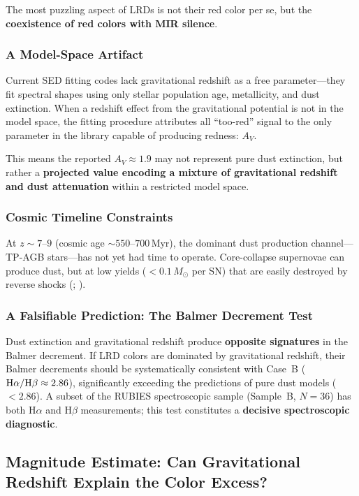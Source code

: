 \documentclass[apj,twocolumn,longbibliography,linenumbers]{aastex701}
\begin{document}
The most puzzling aspect of LRDs is not their red color per se, but the \textbf{coexistence of red colors with MIR silence}.

\subsubsection{A Model-Space Artifact}

Current SED fitting codes lack gravitational redshift as a free parameter---they fit spectral shapes using only stellar population age, metallicity, and dust extinction. When a redshift effect from the gravitational potential is not in the model space, the fitting procedure attributes all ``too-red'' signal to the only parameter in the library capable of producing redness: $A_V$.

This means the reported $A_V \approx 1.9$ may not represent pure dust extinction, but rather a \textbf{projected value encoding a mixture of gravitational redshift and dust attenuation} within a restricted model space.

\subsubsection{Cosmic Timeline Constraints}

At $z \sim 7$--$9$ (cosmic age ${\sim}550$--$700$\,Myr), the dominant dust production channel---TP-AGB stars---has not yet had time to operate. Core-collapse supernovae can produce dust, but at low yields ($< 0.1\,M_\odot$ per SN) that are easily destroyed by reverse shocks (\citealt{Gall2011}; \citealt{Matsuura2015}).

\subsubsection{A Falsifiable Prediction: The Balmer Decrement Test}

Dust extinction and gravitational redshift produce \textbf{opposite signatures} in the Balmer decrement. If LRD colors are dominated by gravitational redshift, their Balmer decrements should be systematically consistent with Case~B (${\rm H}\alpha/{\rm H}\beta \approx 2.86$), significantly exceeding the predictions of pure dust models ($< 2.86$). A subset of the RUBIES spectroscopic sample (Sample~B, $N = 36$) has both H$\alpha$ and H$\beta$ measurements; this test constitutes a \textbf{decisive spectroscopic diagnostic}.

\subsection{Magnitude Estimate: Can Gravitational Redshift Explain the Color Excess?}
\end{document}
